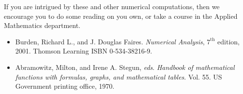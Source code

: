 If you are intrigued by these and other numerical computations, then we
encourage you to do some reading on you own, or take a course in the Applied
Mathematics department.

\begin{itemize}
  \item Burden, Richard L., and J. Douglas Faires. \emph{Numerical Analysis},
  $7^\text{th}$ edition, 2001. Thomson Learning ISBN 0-534-38216-9.
  \item Abramowitz, Milton, and Irene A. Stegun, \emph{eds}. \emph{Handbook of
    mathematical functions with formulas, graphs, and mathematical tables}. Vol.
    55. US Government printing office, 1970.
\end{itemize}

